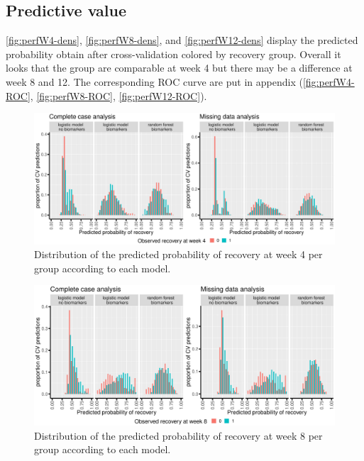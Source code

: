 \documentclass[12pt]{article}
\begin{document}
\subsection{Predictive value}
\label{sec:orga494bb8}

\autoref{fig:perfW4-dens}, \autoref{fig:perfW8-dens}, and
\autoref{fig:perfW12-dens} display the predicted probability obtain
after cross-validation colored by recovery group. Overall it looks
that the group are comparable at week 4 but there may be a difference
at week 8 and 12. The corresponding ROC curve are put in appendix
(\autoref{fig:perfW4-ROC}, \autoref{fig:perfW8-ROC},
\autoref{fig:perfW12-ROC}).

\begin{figure}[!h]
\centering
\includegraphics[trim={0 0 0 0},width=\textwidth]{./../figures/hist-pred-week4.pdf}
\caption{\label{fig:perfW4-dens}Distribution of the predicted probability of recovery at week 4 per group according to each model.}
\end{figure}

\clearpage

\begin{figure}[!h]
\centering
\includegraphics[trim={0 0 0 0},width=\textwidth]{./../figures/hist-pred-week8.pdf}
\caption{\label{fig:perfW8-dens}Distribution of the predicted probability of recovery at week 8 per group according to each model.}
\end{figure}
\end{document}
